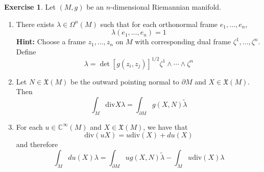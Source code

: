 \documentclass{book}
\theoremstyle{definition}
\newtheorem{ex}[definition]{Exercise}
\newcommand{\ze}{\zeta}
\newcommand{\lam}{\lambda}
\newcommand{\Om}{\Omega}
\newcommand{\C}{\mathbb{C}}
\DeclareMathOperator*{\0}{\mbf{0}}
\DeclareMathOperator*{\1}{\mbf{1}}
\renewcommand{\div}{\text{div}}
\newcommand{\tbf}[1]{\textbf{#1}}
\newcommand{\p}{\partial}
\begin{document}
\begin{ex}
	Let $(M, g)$ be an $n$-dimensional Riemannian manifold.
	\begin{enumerate}
		\item There exists $\lam \in \Om^n(M)$ such that for each orthonormal frame $e_1, \ldots, e_n$, 
		$$\lam(e_1, \ldots, e_n) = 1$$
		\tbf{Hint:} Choose a frame $z_1, \ldots, z_n$ on $M$ with corresponding dual frame $\ze^1, \ldots, \ze^n$. Define $$\lam = \det [g(z_i, z_j)]^{1/2} \ze^1 \wedge \cdots \wedge \ze^n$$
		\item Let $N \in \mathfrak{X}(M)$ be the outward pointing normal to $\p M$ and $X \in \mathfrak{X}(M)$. Then 
		$$\int_M \div X \lam = \int_{\p M} g(X, N) \tilde{\lam}$$
		\item For each $u \in \C^{\infty}(M)$ and $X \in \mathfrak{X}(M)$, we have that 
		$$\div(uX) = u \div(X) + du(X)$$ 
		and therefore
		$$\int_M du(X) \lam = \int_{\p M} u g(X, N) \tilde{\lam} - \int_{M} u \div(X) \lam$$
	\end{enumerate}
\end{ex}
\end{document}

